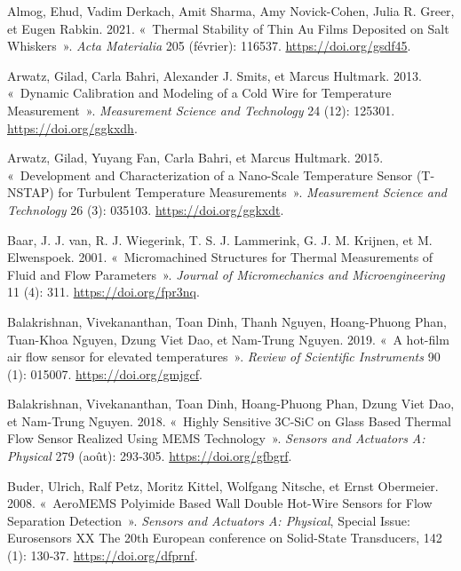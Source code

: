\documentclass[
]{article}
\newlength{\cslhangindent}
\newenvironment{CSLReferences}[2] %
 {\begin{list}{}{%
  \setlength{\itemindent}{0pt}
  \setlength{\leftmargin}{0pt}
  \setlength{\parsep}{0pt}
  \ifodd #1
   \setlength{\leftmargin}{\cslhangindent}
   \setlength{\itemindent}{-1\cslhangindent}
  \fi
  \setlength{\itemsep}{#2\baselineskip}}}
 {\end{list}}
\begin{document}
\label{refs}
\begin{CSLReferences}{1}{0}
Almog, Ehud, Vadim Derkach, Amit Sharma, Amy Novick-Cohen, Julia R.
Greer, et Eugen Rabkin. 2021. {«~Thermal Stability of Thin Au Films
Deposited on Salt Whiskers~»}. \emph{Acta Materialia} 205 (février):
116537. \url{https://doi.org/gsdf45}.

Arwatz, Gilad, Carla Bahri, Alexander J. Smits, et Marcus Hultmark.
2013. {«~Dynamic Calibration and Modeling of a Cold Wire for Temperature
Measurement~»}. \emph{Measurement Science and Technology} 24 (12):
125301. \url{https://doi.org/ggkxdh}.

Arwatz, Gilad, Yuyang Fan, Carla Bahri, et Marcus Hultmark. 2015.
{«~Development and Characterization of a Nano-Scale Temperature Sensor
(T-NSTAP) for Turbulent Temperature Measurements~»}. \emph{Measurement
Science and Technology} 26 (3): 035103. \url{https://doi.org/ggkxdt}.

Baar, J. J. van, R. J. Wiegerink, T. S. J. Lammerink, G. J. M. Krijnen,
et M. Elwenspoek. 2001. {«~Micromachined Structures for Thermal
Measurements of Fluid and Flow Parameters~»}. \emph{Journal of
Micromechanics and Microengineering} 11 (4): 311.
\url{https://doi.org/fpr3nq}.

Balakrishnan, Vivekananthan, Toan Dinh, Thanh Nguyen, Hoang-Phuong Phan,
Tuan-Khoa Nguyen, Dzung Viet Dao, et Nam-Trung Nguyen. 2019. {«~A
hot-film air flow sensor for elevated temperatures~»}. \emph{Review of
Scientific Instruments} 90 (1): 015007. \url{https://doi.org/gmjgcf}.

Balakrishnan, Vivekananthan, Toan Dinh, Hoang-Phuong Phan, Dzung Viet
Dao, et Nam-Trung Nguyen. 2018. {«~Highly Sensitive 3C-SiC on Glass
Based Thermal Flow Sensor Realized Using MEMS Technology~»}.
\emph{Sensors and Actuators A: Physical} 279 (août): 293‑305.
\url{https://doi.org/gfbgrf}.

Buder, Ulrich, Ralf Petz, Moritz Kittel, Wolfgang Nitsche, et Ernst
Obermeier. 2008. {«~AeroMEMS Polyimide Based Wall Double Hot-Wire
Sensors for Flow Separation Detection~»}. \emph{Sensors and Actuators A:
Physical}, Special Issue: Eurosensors XX The 20th European conference on
Solid-State Transducers, 142 (1): 130‑37. \url{https://doi.org/dfprnf}.


\end{CSLReferences}
\end{document}
